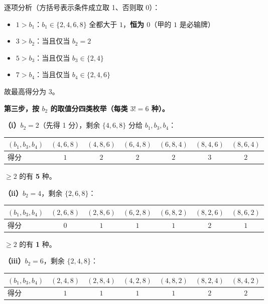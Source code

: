 逐项分析（方括号表示条件成立取 1、否则取 0）：

\begin{itemize}
\item $1>b_1$：$b_1\in\{2,4,6,8\}$ 全都大于 $1$，\textbf{恒为 $0$}（甲的 $1$ 是必输牌）
\item $3>b_2$：当且仅当 $b_2=2$
\item $5>b_3$：当且仅当 $b_3\in\{2,4\}$
\item $7>b_4$：当且仅当 $b_4\in\{2,4,6\}$
\end{itemize}

故最高得分为 $3$。

\textbf{第三步，按 $b_2$ 的取值分四类枚举（每类 $3!=6$ 种）。}

\textbf{（i）$b_2=2$}（先得 1 分），剩余 $\{4,6,8\}$ 分给 $b_1,b_3,b_4$：

\begin{center}
\begin{tabular}{lcccccc}
\toprule
$\left(b_1,b_3,b_4\right)$ & $(4,6,8)$ & $(4,8,6)$ & $(6,4,8)$ & $(6,8,4)$ & $(8,4,6)$ & $(8,6,4)$ \\
\midrule
得分 & $1$ & $2$ & $2$ & $2$ & $3$ & $2$ \\
\bottomrule
\end{tabular}
\end{center}

$\ge2$ 的有 \textbf{5} 种。

\textbf{（ii）$b_2=4$}，剩余 $\{2,6,8\}$：

\begin{center}
\begin{tabular}{lcccccc}
\toprule
$\left(b_1,b_3,b_4\right)$ & $(2,6,8)$ & $(2,8,6)$ & $(6,2,8)$ & $(6,8,2)$ & $(8,2,6)$ & $(8,6,2)$ \\
\midrule
得分 & $0$ & $1$ & $1$ & $1$ & $2$ & $1$ \\
\bottomrule
\end{tabular}
\end{center}

$\ge2$ 的有 \textbf{1} 种。

\textbf{（iii）$b_2=6$}，剩余 $\{2,4,8\}$：

\begin{center}
\begin{tabular}{lcccccc}
\toprule
$\left(b_1,b_3,b_4\right)$ & $(2,4,8)$ & $(2,8,4)$ & $(4,2,8)$ & $(4,8,2)$ & $(8,2,4)$ & $(8,4,2)$ \\
\midrule
得分 & $1$ & $1$ & $1$ & $1$ & $2$ & $2$ \\
\bottomrule
\end{tabular}
\end{center}

